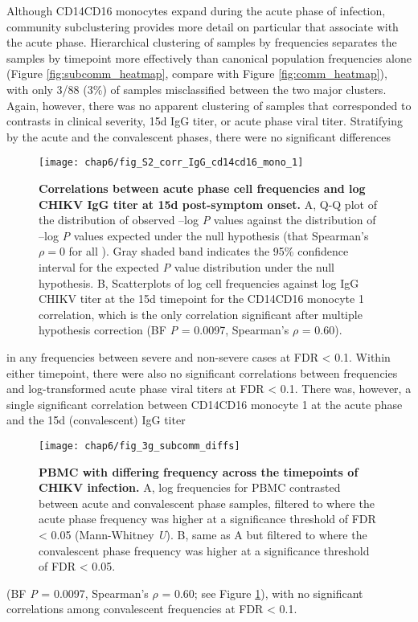 Although CD14\sups{+}\allowbreak CD16\sups{+} monocytes expand during the acute phase of infection, community subclustering provides more detail on particular \subcommunities{} that associate with the acute phase. Hierarchical clustering of samples by \subcommunity{} frequencies separates the samples by timepoint more effectively than canonical population frequencies alone (Figure \ref{fig:subcomm_heatmap}, compare with Figure \ref{fig:comm_heatmap}), with only 3/88 (3\%) of samples misclassified between the two major clusters. Again, however, there was no apparent clustering of samples that corresponded to contrasts in clinical severity, 15d IgG titer, or acute phase viral titer. Stratifying by the acute and the convalescent phases, there were no significant differences
\begin{figure}[tb]
  \centering
  \texttt{[image: chap6/fig\_S2\_corr\_IgG\_cd14cd16\_mono\_1]}
  \caption[Correlations between acute phase cell \subcommunity{} frequencies and 15d CHIKV IgG titer]{
  \textbf{Correlations between acute phase cell \subcommunity{} frequencies and log CHIKV IgG titer at 15d post-symptom onset.} A, Q-Q plot of the distribution of observed –log \emph{P} values against the distribution of –log \emph{P} values expected under the null hypothesis (that Spearman’s $\rho = 0$ for all \subcommunities). Gray shaded band indicates the 95\% confidence interval for the expected \emph{P} value distribution under the null hypothesis. B, Scatterplots of log cell \subcommunity{} frequencies against log IgG CHIKV titer at the 15d timepoint for the CD14\sups{+}CD16\sups{+} monocyte 1 correlation, which is the only correlation significant after multiple hypothesis correction (BF \emph{P} = 0.0097, Spearman’s $\rho$ = 0.60).
  }
  \label{fig:corr_cytof_igg}
\end{figure}
in any \subcommunity{} frequencies between severe and non-severe cases at FDR < 0.1. Within either timepoint, there were also no significant correlations between \subcommunity{} frequencies and log-transformed acute phase viral titers at FDR < 0.1. There was, however, a single significant correlation between CD14\sups{+}\allowbreak CD16\sups{+} monocyte \subcommunity{} 1 at the acute phase and the 15d (convalescent) IgG titer
\begin{figure*}[htb]
  \centering
  \texttt{[image: chap6/fig\_3g\_subcomm\_diffs]}
  \caption[PBMC \subcommunities{} with differing frequency across the CHIKV infection phases]{
  \textbf{PBMC \subcommunities{} with differing frequency across the timepoints of CHIKV infection.} A, log frequencies for PBMC \subcommunities{} contrasted between acute and convalescent phase samples, filtered to \subcommunities{} where the acute phase frequency was higher at a significance threshold of FDR < 0.05 (Mann-Whitney \emph{U}). B, same as A but filtered to \subcommunities{} where the convalescent phase frequency was higher at a significance threshold of FDR < 0.05.
  }
  \label{fig:subcomm_diffs}
\end{figure*}
(BF \emph{P} = 0.0097, Spearman’s $\rho$ = 0.60; see Figure \ref{fig:corr_cytof_igg}), with no significant correlations among convalescent \subcommunity{} frequencies at FDR < 0.1.

